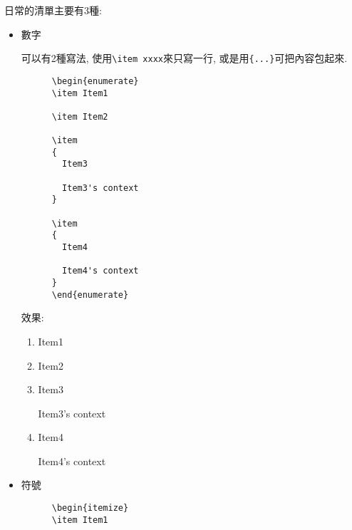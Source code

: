 
  日常的清單主要有3種:

\begin{itemize}
  \item
  {
    數字

    可以有2種寫法, 使用\verb|\item xxxx|來只寫一行, 或是用\verb|{...}|可把內容包起來.\\

    \begin{DescriptionFrame}
    \begin{verbatim}
      \begin{enumerate}
      \item Item1

      \item Item2

      \item
      {
        Item3

        Item3's context
      }

      \item
      {
        Item4

        Item4's context
      }
      \end{enumerate}
    \end{verbatim}
    \end{DescriptionFrame}

    效果:
    \begin{enumerate}
      \item Item1

      \item Item2

      \item
      {
        Item3

        Item3's context
      }

      \item
      {
        Item4

        Item4's context
      }
    \end{enumerate}
  } %

  \newpage
  \item
  {
    符號

    \begin{DescriptionFrame}
    \begin{verbatim}
      \begin{itemize}
      \item Item1


\end{verbatim}
\end{DescriptionFrame}}
\end{itemize}
